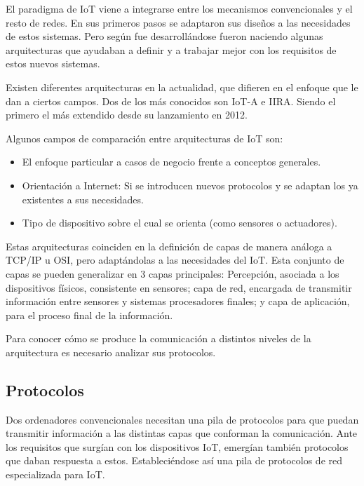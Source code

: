 \documentclass[a4paper,10pt]{article}
\begin{document}
El paradigma de IoT viene a integrarse entre los mecanismos
convencionales y el resto de redes. En sus primeros pasos se adaptaron
sus diseños a las necesidades de estos sistemas. Pero según fue
desarrollándose fueron naciendo algunas arquitecturas que ayudaban a
definir y a trabajar mejor con los requisitos de estos nuevos sistemas.

Existen diferentes arquitecturas en la actualidad, que difieren en el
enfoque que le dan a ciertos campos. Dos de los más conocidos son IoT-A
e IIRA. Siendo el primero el más extendido desde su lanzamiento en 2012\cite{weyrichReferenceArchitecturesInternet2016}.

Algunos campos de comparación entre arquitecturas de IoT son\cite{atzoriInternetThingsSurvey2010}:

\begin{itemize}
\item
  El enfoque particular a casos de negocio frente a conceptos generales.
\item
  Orientación a Internet: Si se introducen nuevos protocolos y se
  adaptan los ya existentes a sus necesidades.
\item
  Tipo de dispositivo sobre el cual se orienta (como sensores o
  actuadores).
\end{itemize}

Estas arquitecturas coinciden en la definición de capas de manera
análoga a TCP/IP u
OSI\cite{weyrichReferenceArchitecturesInternet2016}, pero adaptándolas
a las necesidades del IoT. Esta conjunto de capas se pueden
generalizar en 3 capas principales: Percepción, asociada a los
dispositivos físicos, consistente en sensores; capa de red, encargada
de transmitir información entre sensores y sistemas procesadores
finales; y capa de aplicación, para el proceso final de la
información\cite{khanFutureInternetInternet2012}.

Para conocer cómo se produce la comunicación a distintos niveles de la
arquitectura es necesario analizar sus protocolos.

\subsection{Protocolos}\label{subsec:protocolos}

Dos ordenadores convencionales necesitan una pila de protocolos para que
puedan transmitir información a las distintas capas que conforman la
comunicación. Ante los requisitos que surgían con los dispositivos IoT,
emergían también protocolos que daban respuesta a estos. Estableciéndose
así una pila de protocolos de red especializada para IoT.
\end{document}
